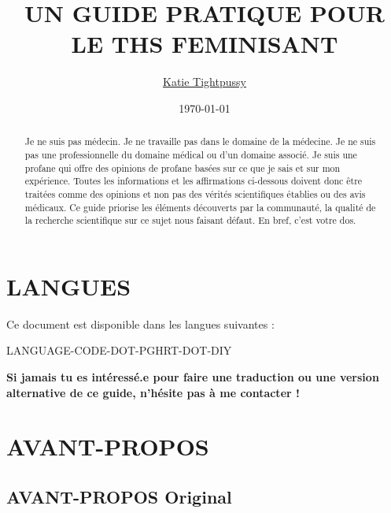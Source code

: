 \documentclass{article}
\title{UN GUIDE PRATIQUE POUR LE THS FEMINISANT}
\author{\href{https://katea.gay/}{Katie Tightpussy}}
\date{\today}
\begin{document}
\maketitle
\tableofcontents
\begin{abstract}
  Je ne suis pas médecin. Je ne travaille pas dans le domaine de la médecine. Je ne suis pas une professionnelle du domaine médical ou d'un domaine associé. Je suis une profane qui offre des opinions de profane basées sur ce que je sais et sur mon expérience. Toutes les informations et les affirmations ci-dessous doivent donc être traitées comme des opinions et non pas des vérités scientifiques établies ou des avis médicaux. Ce guide priorise les éléments découverts par la communauté, la qualité de la recherche scientifique sur ce sujet nous faisant défaut. En bref, c'est votre dos.
\end{abstract}

\section*{LANGUES}

Ce document est disponible dans les langues suivantes :

LANGUAGE-CODE-DOT-PGHRT-DOT-DIY

\noindent\textbf{Si jamais tu es intéressé.e pour faire une traduction ou une version alternative de ce guide, n'hésite pas à me contacter !}



\section{AVANT-PROPOS}

\subsection{AVANT-PROPOS Original}
\end{document}
